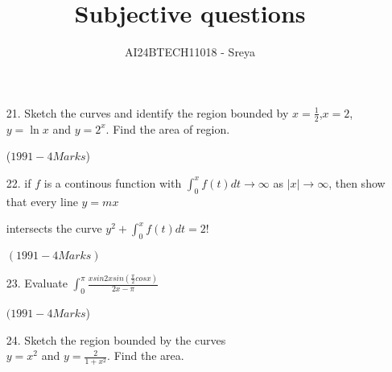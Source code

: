 \documentclass[journal,12pt,twocolumn]{IEEEtran}
\theoremstyle{remark}
\begin{document}

\vspace{3cm}

\title{Subjective questions}
\author{AI24BTECH11018 - Sreya}
\maketitle
\newpage
\bigskip
\begin{enumerate}

    

\renewcommand{\thefigure}{\theenumi}
\renewcommand{\thetable}{\theenumi}
\item[21.] Sketch the curves and identify the region bounded by $x=\frac{1}{2}$,$x=2$,$y=\ln{x}$ and $y=2^x$. Find the area of region.

\hfill{($1991-4 Marks$)}

\item[22.] if $f$ is a continous function with $\int_{0}^{x}f(t)dt\rightarrow\infty$ as $\mid x \mid\rightarrow\infty$, then show that every line $y=mx$\\

intersects the curve $y^2+\int_{0}^{x}f(t)dt=2!$

\hfill{$(1991-4 Marks)$}\\

\item[23.] Evaluate $\int_{0}^{\pi}\frac{xsin2xsin(\frac{\pi}{2}cosx)}{2x-\pi}$

\hfill{$(1991-4 Marks$)}

\item[24.]  Sketch the region bounded by the curves\\ $y=x^2$ and
$y=\frac{2}{1+x^2}$. Find the area.



\end{enumerate}
\end{document}
